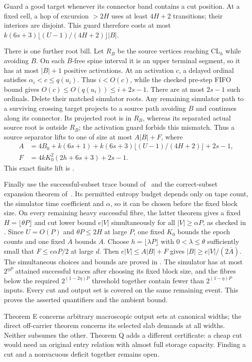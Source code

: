 \begin{outline}
Guard a good target whenever its connector band contains a cut position.
At a fixed cell, a hop of excursion $>2H$ uses at least $4H+2$ transitions;
their interiors are disjoint. This guard therefore costs at most
$k(6s+3)\lfloor(U-1)/(4H+2)\rfloor|B|$.

There is one further root bill. Let $R_B$ be the source vertices reaching
$\mathrm{CL}_h$ while avoiding $B$. On each $B$-free spine interval it is an
upper terminal segment, so it has at most $|B|+1$ positive activations.
At an activation $c$, a delayed ordinal satisfies
$\alpha_i<c\le q(u_i)$. Thus $i<O(c)$, while the checked pre-step FIFO
bound gives $O(c)\le O(q(u_i))\le i+2s-1$.
There are at most $2s-1$ such ordinals. Delete their matched simulator roots.
Any remaining simulator path to a surviving crossing target projects to a
source path avoiding $B$ and continues along its connector. Its projected
root is in $R_B$, whereas its separated actual source root is outside $R_B$;
the activation guard forbids this mismatch. Thus a source separator lifts to
one of size at most $A|B|+F$, where
\[
\begin{split}
 A&=4B_0+k(6s+1)+k(6s+3)\lfloor(U-1)/(4H+2)\rfloor+2s-1,\\
 F&=4kK_0^2(2h+6s+3)+2s-1.
\end{split}
\]
This exact finite lift is .

Finally use the successful-subset trace bound of~\cite{HighRateStorage2026}
and the correct-subset expansion theorem of~\cite{MacroscopicCrossings2026}.
Its permitted entropy budget depends only on tape count, the simulator time
coefficient and $\alpha$, so it can be chosen before the fixed block size.
On every
remaining heavy successful fibre, the latter theorem gives a fixed
$H=\lfloor\theta P\rfloor$ and cut lower bound $e|V|$ simultaneously for
all $|V|\ge\alpha P$, as checked in
.
Since $U=O(P)$ and $\theta P\le2H$ at large $P$, one fixed $K_0$ bounds
the epoch counts and one fixed $\overline A$ bounds $A$.
Choose $h=\lfloor\lambda P\rfloor$ with $0<\lambda\le\theta$ sufficiently small that
$F\le e\alpha P/2$ at large $d$. Then
$e|V|\le A|B|+F$ gives $|B|\ge e|V|/(2\overline A)$.
The simultaneous choices and bounds are proved in
.
The simulator has at most $2^{\eta P}$ attained successful traces after
choosing its fixed block size, and the fibres below the required
$2^{(1-2\eta)P}$ threshold together contain fewer than
$2^{(1-\eta)P}$ inputs. Every cut and output set is covered on the same
remaining event. This proves the asserted quantifiers and the ambient bound.
\end{outline}

Theorem E concerns arbitrary macroscopic output sets at canonical widths;
the direct off-carrier theorem concerns its selected slab demands at all
widths. Neither subsumes the other. Theorem Q adds a different certificate:
a cheap cut would need an original entry relation with almost full storage
capacity. Finding a cut and a nonvacuous deficit together remains open.
